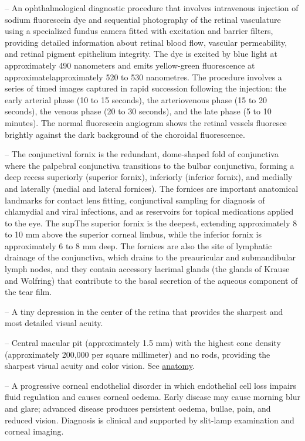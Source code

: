 -- An ophthalmological diagnostic procedure that involves intravenous injection of sodium fluorescein dye and sequential photography of the retinal vasculature using a specialized fundus camera fitted with excitation and barrier filters, providing detailed information about retinal blood flow, vascular permeability, and retinal pigment epithelium integrity. The dye is excited by blue light at approximately 490 nanometers and emits yellow-green fluorescence at approximatelapproximately 520 to 530 nanometres. The procedure involves a series of timed images captured in rapid succession following the injection: the early arterial phase (10 to 15 seconds), the arteriovenous phase (15 to 20 seconds), the venous phase (20 to 30 seconds), and the late phase (5 to 10 minutes). The normal fluorescein angiogram shows the retinal vessels fluoresce brightly against the dark background of the choroidal fluorescence.

-- The conjunctival fornix is the redundant, dome-shaped fold of conjunctiva where the palpebral conjunctiva transitions to the bulbar conjunctiva, forming a deep recess superiorly (superior fornix), inferiorly (inferior fornix), and medially and laterally (medial and lateral fornices). The fornices are important anatomical landmarks for contact lens fitting, conjunctival sampling for diagnosis of chlamydial and viral infections, and as reservoirs for topical medications applied to the eye. The supThe superior fornix is the deepest, extending approximately 8 to 10 mm above the superior corneal limbus, while the inferior fornix is approximately 6 to 8 mm deep. The fornices are also the site of lymphatic drainage of the conjunctiva, which drains to the preauricular and submandibular lymph nodes, and they contain accessory lacrimal glands (the glands of Krause and Wolfring) that contribute to the basal secretion of the aqueous component of the tear film.

-- A tiny depression in the center of the retina that provides the sharpest and most detailed visual acuity.

-- Central macular pit (approximately 1.5 mm) with the highest cone density (approximately 200,000 per square millimeter) and no rods, providing the sharpest visual acuity and color vision. See \hyperlink{Anatomy}{anatomy}.

-- A progressive corneal endothelial disorder in which endothelial cell loss impairs fluid regulation and causes corneal oedema. Early disease may cause morning blur and glare; advanced disease produces persistent oedema, bullae, pain, and reduced vision. Diagnosis is clinical and supported by slit-lamp examination and corneal imaging.


